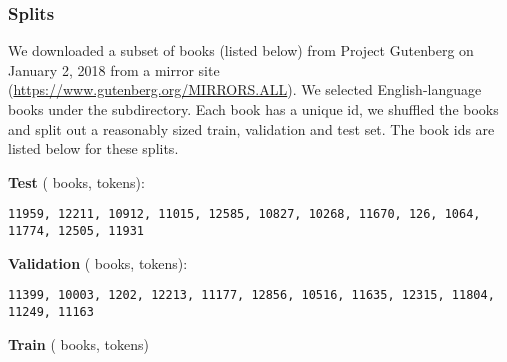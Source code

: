 \documentclass{article} \usepackage{hyperref}
\begin{document}
\label{appendix:gutenberg}

\subsubsection{Splits}

We downloaded a subset of books (listed below) from Project Gutenberg on January 2, 2018 from a mirror site (\url{https://www.gutenberg.org/MIRRORS.ALL}). We selected  English-language books under the  subdirectory. Each book has a unique id, we shuffled the books and split out a reasonably sized train, validation and test set. The book ids are listed below for these splits.

\textbf{Test} ( books,  tokens):

\texttt{\tiny 11959, 12211, 10912, 11015, 12585, 10827, 10268, 11670, 126, 1064, 11774, 12505, 11931}

\textbf{Validation} ( books,  tokens):

\texttt{\tiny 11399,  10003,  1202,  12213,  11177,  12856,  10516,  11635,  12315,  11804,  11249,  11163}

\textbf{Train} ( books,  tokens)
\end{document}
